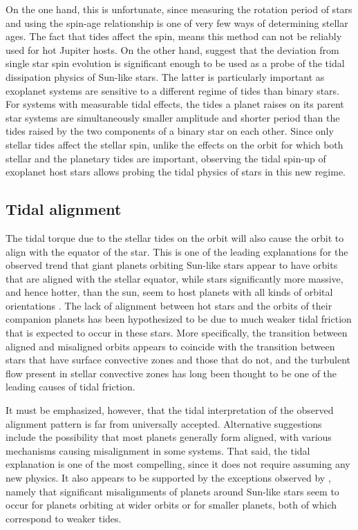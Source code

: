 On the one hand, this is unfortunate, since measuring the rotation period of
stars and using the spin-age relationship is one of very few ways of determining
stellar ages. The fact that tides affect the spin, means this method can not be
reliably used for hot Jupiter hosts. On the other hand, \citet{Penev_et_al_18}
suggest that the deviation from single star spin evolution is significant enough
to be used as a probe of the tidal dissipation physics of Sun-like stars. The
latter is particularly important as exoplanet systems are sensitive to a
different regime of tides than binary stars. For systems with measurable tidal
effects, the tides a planet raises on its parent star systems are simultaneously
smaller amplitude and shorter period than the tides raised by the two components
of a binary star on each other. Since only stellar tides affect the stellar
spin, unlike the effects on the orbit for which both stellar and the planetary
tides are important, observing the tidal spin-up of exoplanet host stars allows
probing the tidal physics of stars in this new regime.

\subsection{Tidal alignment}

The tidal torque due to the stellar tides on the orbit will also cause the orbit
to align with the equator of the star. This is one of the leading explanations
for the observed trend that giant planets orbiting Sun-like stars appear to
have orbits that are aligned with the stellar equator, while stars significantly
more massive, and hence hotter, than the sun, seem to host planets with all
kinds of orbital orientations \citep[c.f. chapter 5.2 of][]{Winn_Fabrycky_2015}.
The lack of alignment between hot stars and the orbits of their companion
planets has been hypothesized to be due to much weaker tidal friction that is
expected to occur in these stars. More specifically, the transition between
aligned and misaligned orbits appears to coincide with the transition between
stars that have surface convective zones and those that do not, and the
turbulent flow present in stellar convective zones has long been thought to be
one of the leading causes of tidal friction.

It must be emphasized, however, that the tidal interpretation of the observed
alignment pattern is far from universally accepted.  Alternative suggestions
include the possibility that most planets generally form aligned, with various
mechanisms causing misalignment in some systems. That said, the tidal
explanation is one of the most compelling, since it does not require assuming
any new physics. It also appears to be supported by the exceptions observed by
\citet{Winn_Fabrycky_2015}, namely that significant misalignments of planets
around Sun-like stars seem to occur for planets orbiting at wider orbits or for
smaller planets, both of which correspond to weaker tides.

